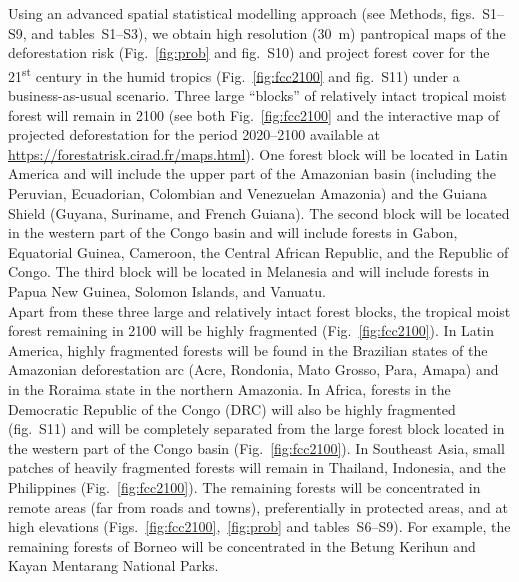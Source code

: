 \documentclass[
  12pt,
]{article}
\begin{document}
Using an advanced spatial statistical modelling approach (see Methods, figs.~S1--S9, and tables~S1--S3), we obtain high resolution (30~m) pantropical maps of the deforestation risk (Fig.~\ref{fig:prob} and fig.~S10) and project forest cover for the 21\textsuperscript{st} century in the humid tropics (Fig.~\ref{fig:fcc2100} and fig.~S11) under a business-as-usual scenario. Three large ``blocks'' of relatively intact tropical moist forest will remain in 2100 (see both Fig.~\ref{fig:fcc2100} and the interactive map of projected deforestation for the period 2020--2100 available at \url{https://forestatrisk.cirad.fr/maps.html}). One forest block will be located in Latin America and will include the upper part of the Amazonian basin (including the Peruvian, Ecuadorian, Colombian and Venezuelan Amazonia) and the Guiana Shield (Guyana, Suriname, and French Guiana). The second block will be located in the western part of the Congo basin and will include forests in Gabon, Equatorial Guinea, Cameroon, the Central African Republic, and the Republic of Congo. The third block will be located in Melanesia and will include forests in Papua New Guinea, Solomon Islands, and Vanuatu.\\

Apart from these three large and relatively intact forest blocks, the tropical moist forest remaining in 2100 will be highly fragmented (Fig.~\ref{fig:fcc2100}). In Latin America, highly fragmented forests will be found in the Brazilian states of the Amazonian deforestation arc (Acre, Rondonia, Mato Grosso, Para, Amapa) and in the Roraima state in the northern Amazonia. In Africa, forests in the Democratic Republic of the Congo (DRC) will also be highly fragmented (fig.~S11) and will be completely separated from the large forest block located in the western part of the Congo basin (Fig.~\ref{fig:fcc2100}). In Southeast Asia, small patches of heavily fragmented forests will remain in Thailand, Indonesia, and the Philippines (Fig.~\ref{fig:fcc2100}). The remaining forests will be concentrated in remote areas (far from roads and towns), preferentially in protected areas, and at high elevations (Figs.~\ref{fig:fcc2100},~\ref{fig:prob} and tables~S6--S9). For example, the remaining forests of Borneo will be concentrated in the Betung Kerihun and Kayan Mentarang National Parks.\\
\end{document}
